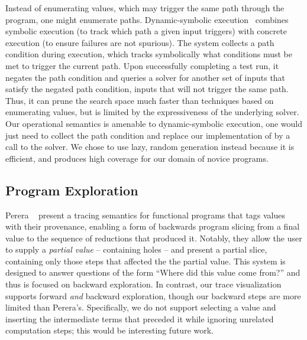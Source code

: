 Instead of enumerating values, which may trigger the same path through
the program, one might enumerate paths. 
%
Dynamic-symbolic execution~\cite{godefroid_dart:_2005,cadar_klee:_2008,tillmann_pex_2008}
%
combines symbolic execution (to track which path a given input
triggers) with concrete execution (to ensure failures are
not spurious). The system collects a path condition during execution,
which tracks symbolically what conditions must be met to trigger the
current path. Upon successfully completing a test run, it negates the
path condition and queries a solver for another set of inputs that
satisfy the negated path condition, \ie inputs that will not trigger the
same path. Thus, it can prune the search space
much faster than techniques based on enumerating values, but is limited
by the expressiveness of the underlying solver. Our operational
semantics is amenable to dynamic-symbolic execution, one would just need
to collect the path condition and replace our implementation of \gensym
by a call to the solver. We chose to use lazy, random generation instead
because it is efficient, and %
produces high coverage for our domain of novice programs.


\subsection{Program Exploration}
Perera \etal~\cite{perera_functional_2012} present a tracing semantics
for functional programs that tags values with their provenance, enabling
a form of backwards program slicing from a final value to the sequence
of reductions that produced it. Notably, they allow the user to supply a
\emph{partial value} -- containing holes -- and present a partial slice,
containing only those steps that affected the the partial value. This
system is designed to answer questions of the form ``Where did this
value come from?'' and thus is focused on backward exploration. In
contrast, our trace visualization supports forward \emph{and} backward
exploration, though our backward steps are more limited than
Perera's. Specifically, we do not support selecting a value and
inserting the intermediate terms that preceded it while ignoring
unrelated computation steps; this would be interesting future work.


